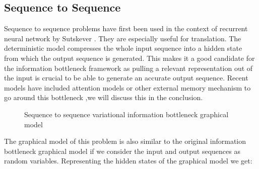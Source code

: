 \documentclass[11pt,oneside,openright]{report}
\begin{document}
\subsection{Sequence to Sequence}
Sequence to sequence problems have first been used in the context of recurrent neural network by Sutskever \cite{s2s}. They are especially useful for translation. The deterministic model compresses the whole input sequence into a hidden state from which the output sequence is generated. This makes it a good candidate for the information bottleneck framework as pulling a relevant representation out of the input is crucial to be able to generate an accurate output sequence. Recent models have included attention \cite{attention} models or other external memory mechanism to go around this bottleneck ,we will discuss this in the conclusion.

\begin{figure}[H]
\centering
{}
\caption{Sequence to sequence variational information bottleneck graphical model}
\end{figure}

The graphical model of this problem is also similar to the original information bottleneck graphical model if we consider the input and output sequences as random variables. Representing the hidden states of the graphical model we get: 
\end{document}

